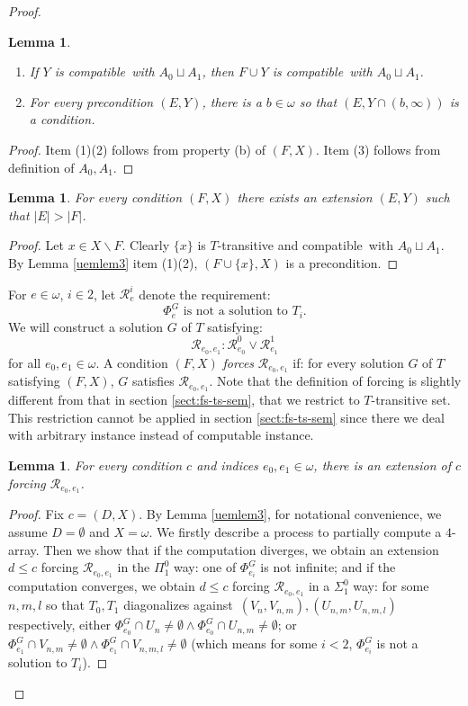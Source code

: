 \documentclass{amsart}
\newtheorem{lemma}[theorem]{Lemma}
\theoremstyle{definition}
\theoremstyle{remark}
\numberwithin{equation}{section}
\theoremstyle{noparens}
\def\mcal{\mathcal}
\renewcommand{\setminus}{\smallsetminus}
\def\iatfs{array}
\def\compatible{compatible}
\def\diagonalagainst{diagonalizes against}
\begin{document}
\begin{proof}
\begin{lemma}
\begin{enumerate}
 \item If $Y$ is    \compatible\ with $A_0\sqcup A_1$, then
 $F\cup Y$ is  \compatible\ with $A_0\sqcup A_1$.

 \item For every precondition $(E,Y)$, there is a $b\in\omega$
 so that $(E,Y\cap (b,\infty))$ is a condition.
\end{enumerate}
\end{lemma}
\begin{proof}
Item (1)(2)
follows from property (b) of $(F,X)$.
Item (3) follows from definition of $A_0,A_1$.
\end{proof}

\begin{lemma}\label{uemlem4}
For every condition $(F, X)$ there exists an extension
$(E, Y)$ such that $|E| > |F|$.
\end{lemma}
\begin{proof}
Let $x\in X\setminus F$.
Clearly $\{x\}$ is $T$-transitive and \compatible\ with $A_0\sqcup A_1$.
By Lemma \ref{uemlem3} item (1)(2),
$(F\cup\{x\}, X)$ is a precondition.
\end{proof}

For $e\in\omega$, $i\in 2$,
let $\mcal{R}_e^i$ denote the
requirement:
$$\Phi_e^G\text{ is not a solution to }T_i.$$
We will construct a solution $G$ of $T$ satisfying:
$$\mcal{R}_{e_0,e_1}: \mcal{R}_{e_0}^0\vee \mcal{R}_{e_1}^1$$
for all $e_0,e_1\in\omega$.
A condition $(F,X)$ \emph{forces}
$\mcal{R}_{e_0,e_1}$ if: for every
  solution  $G$ of $T$ satisfying $(F,X)$,
$G$ satisfies $\mcal{R}_{e_0,e_1}$.
Note that the definition of forcing
is slightly different from that in section \ref{sect:fs-ts-sem},
that we restrict to $T$-transitive set.
This restriction cannot be applied in section \ref{sect:fs-ts-sem} since
 there we deal with arbitrary instance instead of computable instance.

\begin{lemma}\label{uemlemmain}
For every condition $c$
and indices $e_0,e_1\in\omega$,
there is an extension of $c$ forcing $\mcal{R}_{e_0,e_1}$.
\end{lemma}
\begin{proof}
Fix $c=(D,X)$.
By Lemma \ref{uemlem3},
for notational convenience, we assume $D=\emptyset$ and $X=\omega$.
We firstly describe a process to partially compute a
$4$-\iatfs. Then we show that if the computation
diverges, we obtain an extension $d\leq c $ forcing $\mcal{R}_{e_0,e_1}$
in the $\Pi_1^0$ way: one of $\Phi_{e_i}^{G}$ is not infinite; and if the computation converges,
we obtain $d\leq c$ forcing $\mcal{R}_{e_0,e_1}$ in a
$\Sigma_1^0$ way: for some $n,m,l$ so that
$T_0,T_1$ \diagonalagainst\ $(V_n,V_{n,m}), (U_{n,m},U_{n,m,l})$ respectively,
either $\Phi_{e_0}^G\cap U_n\ne\emptyset\wedge\Phi_{e_0}^G\cap U_{n,m}\ne\emptyset$;
or $\Phi_{e_1}^G\cap V_{n,m}\ne\emptyset\wedge\Phi_{e_1}^G\cap V_{n,m,l}\ne\emptyset$
(which means for some $i<2$,  $\Phi_{e_i}^G$ is not a solution to $T_i$).


\end{proof}
\end{proof}
\end{document}
